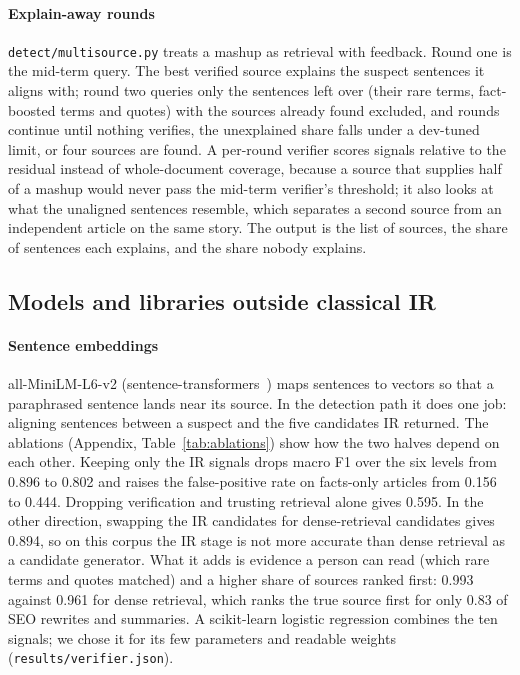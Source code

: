 \documentclass[11pt,a4paper]{article}
\newcommand{\code}[1]{\texttt{#1}}
\begin{document}
\paragraph{Explain-away rounds} \code{detect/multisource.py} treats a mashup as retrieval with feedback. Round one is the mid-term query. The best verified source explains the suspect sentences it aligns with; round two queries only the sentences left over (their rare terms, fact-boosted terms and quotes) with the sources already found excluded, and rounds continue until nothing verifies, the unexplained share falls under a dev-tuned limit, or four sources are found. A per-round verifier scores signals relative to the residual instead of whole-document coverage, because a source that supplies half of a mashup would never pass the mid-term verifier's threshold; it also looks at what the unaligned sentences resemble, which separates a second source from an independent article on the same story. The output is the list of sources, the share of sentences each explains, and the share nobody explains.

\subsection{Models and libraries outside classical IR}

\paragraph{Sentence embeddings} all-MiniLM-L6-v2 (sentence-transformers~\cite{reimers2019}) maps sentences to vectors so that a paraphrased sentence lands near its source. In the detection path it does one job: aligning sentences between a suspect and the five candidates IR returned. The ablations (Appendix, Table~\ref{tab:ablations}) show how the two halves depend on each other. Keeping only the IR signals drops macro F1 over the six levels from 0.896 to 0.802 and raises the false-positive rate on facts-only articles from 0.156 to 0.444. Dropping verification and trusting retrieval alone gives 0.595. In the other direction, swapping the IR candidates for dense-retrieval candidates gives 0.894, so on this corpus the IR stage is not more accurate than dense retrieval as a candidate generator. What it adds is evidence a person can read (which rare terms and quotes matched) and a higher share of sources ranked first: 0.993 against 0.961 for dense retrieval, which ranks the true source first for only 0.83 of SEO rewrites and summaries. A scikit-learn logistic regression combines the ten signals; we chose it for its few parameters and readable weights (\code{results/verifier.json}).
\end{document}
